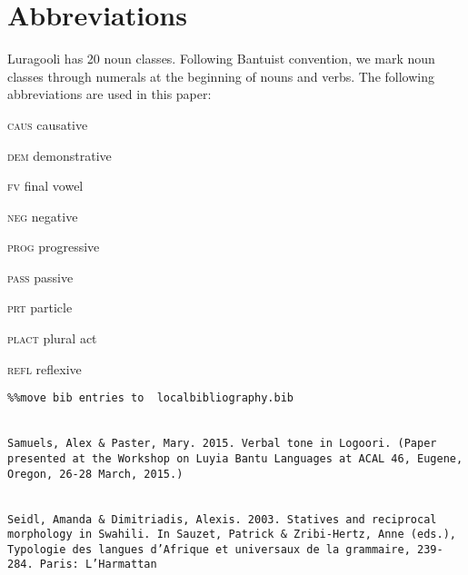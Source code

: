 \documentclass[output=paper]{langsci/langscibook}
\begin{document}
\section*{Abbreviations}

Luragooli has 20 noun classes. Following Bantuist convention, we mark noun classes through numerals at the beginning of nouns and verbs. The following abbreviations are used in this paper: 

\textsc{caus}     causative 

\textsc{dem}     demonstrative 

\textsc{fv}     final vowel

\textsc{neg}     negative   

\textsc{prog}     progressive 

\textsc{pass}     passive 

\textsc{prt}     particle   

\textsc{plact   }plural act 

\textsc{refl}     reflexive


\begin{verbatim}%%move bib entries to  localbibliography.bib


Samuels, Alex & Paster, Mary. 2015. Verbal tone in Logoori. (Paper presented at the Workshop on Luyia Bantu Languages at ACAL 46, Eugene, Oregon, 26-28 March, 2015.)


Seidl, Amanda & Dimitriadis, Alexis. 2003. Statives and reciprocal morphology in Swahili. In Sauzet, Patrick & Zribi-Hertz, Anne (eds.), Typologie des langues d’Afrique et universaux de la grammaire, 239-284. Paris: L’Harmattan



\end{verbatim}

\printbibliography[heading=subbibliography,notkeyword=this]
\end{document}
